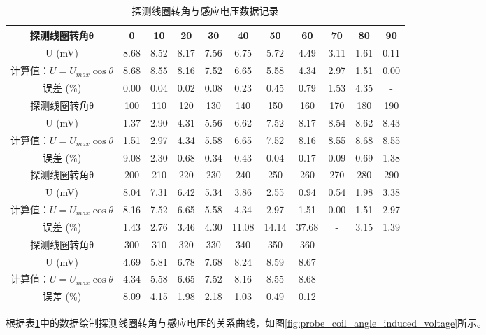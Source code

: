 \documentclass[zihao=5, UTF8]{article}
\theoremstyle{MyLineTheoremStyle} %
\theoremstyle{MyBlockTheoremStyle} %
\theoremstyle{MySubsubsectionStyle} %
\begin{document}
\begin{table}[H]
\centering
\begin{tabular}{|c|c|c|c|c|c|c|c|c|c|c|}
\hline
探测线圈转角θ & 0 & 10 & 20 & 30 & 40 & 50 & 60 & 70 & 80 & 90\\ 
\hline
U (mV) & 8.68 & 8.52 & 8.17 & 7.56 & 6.75 & 5.72 & 4.49 & 3.11 & 1.61 & 0.11\\
\hline
计算值：$U = U_{max}\cos θ$ & 8.68 & 8.55 & 8.16 & 7.52 & 6.65 & 5.58 & 4.34 & 2.97 & 1.51 & 0.00\\
\hline
误差 (\%) & 0.00 & 0.04 & 0.02 & 0.08 & 0.23 & 0.45 & 0.79 & 1.53 & 4.35 & -\\
\hline
探测线圈转角θ & 100 & 110 & 120 & 130 & 140 & 150 & 160 & 170 & 180 & 190\\
\hline
U (mV) & 1.37 & 2.90 & 4.31 & 5.56 & 6.62 & 7.52 & 8.17 & 8.54 & 8.62 & 8.43\\
\hline
计算值：$U = U_{max}\cos θ$ & 1.51 & 2.97 & 4.34 & 5.58 & 6.65 & 7.52 & 8.16 & 8.55 & 8.68 & 8.55\\
\hline
误差 (\%) & 9.08 & 2.30 & 0.68 & 0.34 & 0.43 & 0.04 & 0.17 & 0.09 & 0.69 & 1.38\\
\hline
探测线圈转角θ & 200 & 210 & 220 & 230 & 240 & 250 & 260 & 270 & 280 & 290\\
\hline
U (mV) & 8.04 & 7.31 & 6.42 & 5.34 & 3.86 & 2.55 & 0.94 & 0.54 & 1.98 & 3.38\\
\hline
计算值：$U = U_{max}\cos θ$ & 8.16 & 7.52 & 6.65 & 5.58 & 4.34 & 2.97 & 1.51 & 0.00 & 1.51 & 2.97\\
\hline
误差 (\%) & 1.43 & 2.76 & 3.46 & 4.30 & 11.08 & 14.14 & 37.68 & - & 3.15 & 1.39\\
\hline
探测线圈转角θ & 300 & 310 & 320 & 330 & 340 & 350 & 360 & & & \\
\hline
U (mV) & 4.69 & 5.81 & 6.78 & 7.68 & 8.24 & 8.59 & 8.67 & & & \\
\hline
计算值：$U = U_{max}\cos θ$ & 4.34 & 5.58 & 6.65 & 7.52 & 8.16 & 8.55 & 8.68 & & &\\
\hline
误差 (\%) & 8.09 & 4.15 & 1.98 & 2.18 & 1.03 & 0.49 & 0.12 & & & \\
\hline
\end{tabular}
\caption{探测线圈转角与感应电压数据记录}
\label{tab:probe_coil_angle_induced_voltage_data}
\end{table}

根据表\ref{tab:probe_coil_angle_induced_voltage_data}中的数据绘制探测线圈转角与感应电压的关系曲线，如图\ref{fig:probe_coil_angle_induced_voltage}所示。
\end{document}
